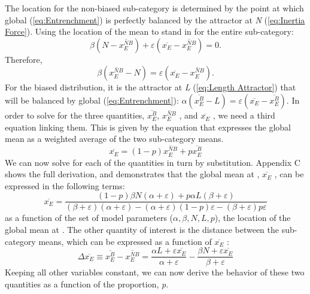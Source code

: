 The  location for the non-biased sub-category is determined
by the point at which global  (\ref{eq:Entrenchment})
is perfectly balanced by the attractor at \emph{N} (\ref{eq:Inertia Force}).
Using the  location of the mean to stand in for the entire
sub-category: \[\beta\left(N-\overline{x_{E}^{NB}}\right)+\varepsilon\left(\overline{x_{E}}-\overline{x_{E}^{NB}}\right)=0\text{.}\]
Therefore, \[\beta\left(\overline{x_{E}^{NB}}-N\right)=\varepsilon\left(\overline{x_{E}}-\overline{x_{E}^{NB}}\right)\text{.}\]
For the biased distribution, it is the attractor at \emph{L} (\ref{eq:Length Attractor})
that will be balanced by global  (\ref{eq:Entrenchment}):
$\alpha(\overline{x_{E}^{B}}-L)=\varepsilon(\overline{x_{E}}-\overline{x_{E}^{B}})$.
In order to solve for the three quantities, $\overline{x_{E}^{B}}$,
$\overline{x_{E}^{NB}}$ , and $\overline{x_{E}}$ , we need a third
equation linking them. This is given by the equation that expresses
the global mean as a weighted average of the two sub-category means.
\begin{equation}
\overline{x_{E}}=(1-p)\overline{x_{E}^{NB}}+p\overline{x_{E}^{B}}\label{eq:weighted mean}
\end{equation}
We can now solve for each of the quantities in turn by substitution.
Appendix C shows the full derivation, and demonstrates that the global
mean at , $\overline{x_{E}}$ , can be expressed in the
following terms:
\begin{equation}
\overline{x_{E}}=\frac{(1-p)\beta N(\alpha+\varepsilon)+p\alpha L(\beta+\varepsilon)}{(\beta+\varepsilon)(\alpha+\varepsilon)-(\alpha+\varepsilon)(1-p)\varepsilon-(\beta+\varepsilon)p\varepsilon}\label{eq: sub-dist}
\end{equation}
as a function of the set of model parameters ($\alpha,\beta,N,L,p$),
the location of the global mean at . The other quantity
of interest is the distance between the sub-category means, which
can be expressed as a function of $\overline{x_{E}}$ :
\begin{equation}
\Delta\overline{x_{E}}\equiv\overline{x_{E}^{B}}-\overline{x_{E}^{NB}}=\frac{\alpha L+\varepsilon\overline{x_{E}}}{\alpha+\varepsilon}-\frac{\beta N+\varepsilon\overline{x_{E}}}{\beta+\varepsilon}\label{eq:State Model-sep}
\end{equation}
Keeping all other variables constant, we can now derive the behavior
of these two quantities as a function of the  proportion, \emph{p}. 

